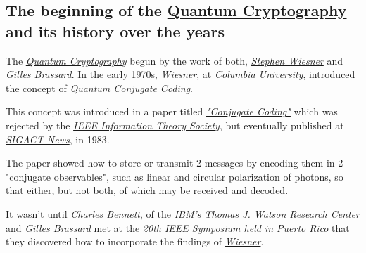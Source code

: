 \documentclass[conference]{IEEEtran}
\begin{document}
\vspace{6pt}

\subsection{The beginning of the \href{https://en.wikipedia.org/wiki/Quantum_cryptography}{Quantum Cryptography}\\ and its history over the years}\label{A4}

\vspace{4pt}

The \href{https://en.wikipedia.org/wiki/Quantum_cryptography}{\textit{Quantum Cryptography}} begun by the work of both, \href{https://en.wikipedia.org/wiki/Stephen_Wiesner}{\textit{Stephen Wiesner}} and \href{https://en.wikipedia.org/wiki/Gilles_Brassard}{\textit{Gilles Brassard}}. In the early 1970s, \href{https://en.wikipedia.org/wiki/Stephen_Wiesner}{\textit{Wiesner}}, at \href{https://en.wikipedia.org/wiki/Columbia_University}{\textit{Columbia University}}, introduced the concept of \textit{Quantum Conjugate Coding}.

\vspace{4pt}

This concept was introduced in a paper titled \href{https://dl.acm.org/citation.cfm?id=1008920}{\textit{"Conjugate Coding"}} which was rejected by the \href{https://www.itsoc.org/}{\textit{IEEE Information Theory Society}}, but eventually published at \href{https://www.sigact.org/SIGACT_News/}{\textit{SIGACT News}}, in 1983.

\vspace{4pt}

The paper showed how to store or transmit 2 messages by encoding them in 2 "conjugate observables", such as linear and circular polarization of photons, so that either, but not both, of which may be received and decoded.

\vspace{4pt}

It wasn't until \href{https://en.wikipedia.org/wiki/Charles_H._Bennett_(computer_scientist)}{\textit{Charles Bennett}}, of the \href{http://research.ibm.com/labs/watson/}{\textit{IBM's Thomas J. Watson Research Center}} and \href{https://en.wikipedia.org/wiki/Gilles_Brassard}{\textit{Gilles Brassard}} met at the \textit{20th IEEE Symposium held in Puerto Rico} that they discovered how to incorporate the findings of \href{https://en.wikipedia.org/wiki/Stephen_Wiesner}{\textit{Wiesner}}.

\vspace{4pt}
\end{document}
